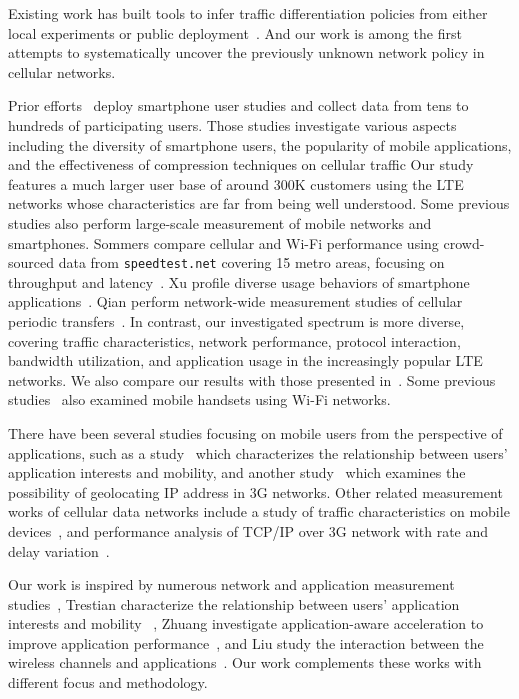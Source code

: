 Existing work has built tools to infer traffic differentiation policies from either local experiments or public deployment~\cite{imc.netpolice, nsdi.glasnost, windrider}. And our work is among the first attempts to systematically uncover the previously unknown network policy in cellular networks.

Prior efforts~\cite{falaki10_mobisys, shepard10, qian13_pam} deploy smartphone user studies and collect data from tens to hundreds of participating users. Those studies investigate various aspects including the diversity of smartphone users, the popularity of mobile applications, and the effectiveness of compression techniques on cellular traffic \etc Our study features a much larger user base of around 300K customers using the LTE networks whose characteristics are far from being well understood. Some previous studies also perform large-scale measurement of mobile networks and smartphones. Sommers \etal compare cellular and Wi-Fi performance using crowd-sourced data from \texttt{speedtest.net} covering 15 metro areas, focusing on throughput and latency~\cite{sommers12}. Xu \etal profile diverse usage behaviors of smartphone applications~\cite{xu11_imc}. Qian \etal perform network-wide measurement studies of cellular periodic transfers~\cite{qian12_www}. In contrast, our investigated spectrum is more diverse, covering traffic characteristics, network performance, protocol interaction, bandwidth utilization, and application usage in the increasingly popular LTE networks. We also compare our results with those presented in~\cite{sommers12}. Some previous studies~\cite{gember11, chen12} also examined mobile handsets using Wi-Fi networks.


There have been several studies focusing on mobile users from the perspective of applications, such as a study~\cite{Ionut:Serendipity:IMC09} which characterizes the relationship between users' application interests and mobility, and another study~\cite{Mahesh:Ephemera:IMC09} which examines the possibility of geolocating IP address in 3G networks. Other related measurement works of cellular data networks include a study of traffic characteristics on mobile devices~\cite{Maier:Traffic:PAM2010}, and performance analysis of TCP/IP over 3G network with rate and delay variation~\cite{Mun:TCP/IP:Mobicom2002}.

Our work is inspired by numerous network and application measurement studies~\cite{Chakravorty:WWAN:Mobicom2004, Zhuang:A3:Mobicom2006, Ionut:Serendipity:IMC09}, \eg Trestian \etal characterize the relationship between users' application interests and mobility ~\cite{Ionut:Serendipity:IMC09}, Zhuang \etal investigate application-aware acceleration to improve application performance~\cite{Zhuang:A3:Mobicom2006}, and Liu \etal study the interaction between the wireless channels and applications~\cite{Liu:3GChannelAppl:Mobicom2008}. Our work complements these works with different focus and methodology. 

